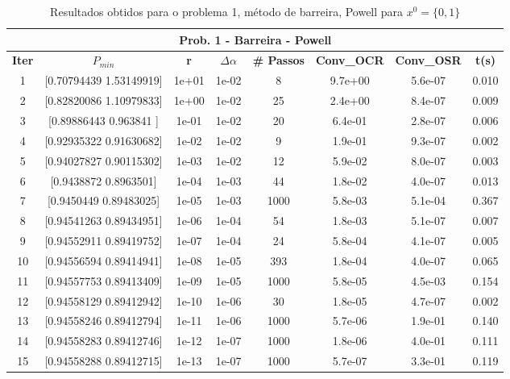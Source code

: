 \documentclass[10pt, a4paper]{article}
\begin{document}
\vspace{5mm}
\begin{table}[H]
  \begin{center}
    \begin{tabular}{c|c|c|c|c|c|c|c}
      \multicolumn{8}{c}{\textbf{Prob. 1 - Barreira - Powell}}\\
      \hline
      \textbf{Iter} & \textbf{$P_{min}$} & \textbf{r} & $\Delta \alpha$ &\textbf{\# Passos} & \textbf{Conv\_OCR} & \textbf{Conv\_OSR} & \textbf{t(s)}\\
      \hline
        1& [0.70794439 1.53149919]& 1e+01& 1e-02 &8& 9.7e+00& 5.6e-07& 0.010       \\
        2& [0.82820086 1.10979833]& 1e+00& 1e-02 &25& 2.4e+00& 8.4e-07& 0.009\\
        3& [0.89886443 0.963841  ]& 1e-01& 1e-02 &20& 6.4e-01& 2.8e-07& 0.006\\
        4& [0.92935322 0.91630682]& 1e-02& 1e-02 &9& 1.9e-01& 9.3e-07& 0.002\\
        5& [0.94027827 0.90115302]& 1e-03& 1e-02 &12& 5.9e-02& 8.0e-07& 0.003\\
        6& [0.9438872 0.8963501]& 1e-04& 1e-03 &44& 1.8e-02& 4.0e-07& 0.013\\
        7& [0.9450449  0.89483025]& 1e-05& 1e-03 &1000& 5.8e-03& 5.1e-04& 0.367\\
        8& [0.94541263 0.89434951]& 1e-06& 1e-04 &54& 1.8e-03& 5.1e-07& 0.007\\
        9& [0.94552911 0.89419752]& 1e-07& 1e-04 &24& 5.8e-04& 4.1e-07& 0.005\\
        10& [0.94556594 0.89414941]& 1e-08& 1e-05 &393& 1.8e-04& 4.0e-07& 0.065\\
        11& [0.94557753 0.89413409]& 1e-09& 1e-05 &1000& 5.8e-05& 4.5e-03& 0.154\\
        12& [0.94558129 0.89412942]& 1e-10& 1e-06 &30& 1.8e-05& 4.7e-07& 0.002\\
        13& [0.94558246 0.89412794]& 1e-11& 1e-06 &1000& 5.7e-06& 1.9e-01& 0.140\\
        14& [0.94558283 0.89412746]& 1e-12& 1e-07 &1000& 1.8e-06& 4.0e-01& 0.111\\
        15& [0.94558288 0.89412715]& 1e-13& 1e-07 &1000& 5.7e-07& 3.3e-01& 0.119\\
    \end{tabular}
  \end{center}
  \caption{Resultados obtidos para o problema 1, método de barreira, Powell para $x^0=\{0,1\}$}
\end{table}
\end{document}
